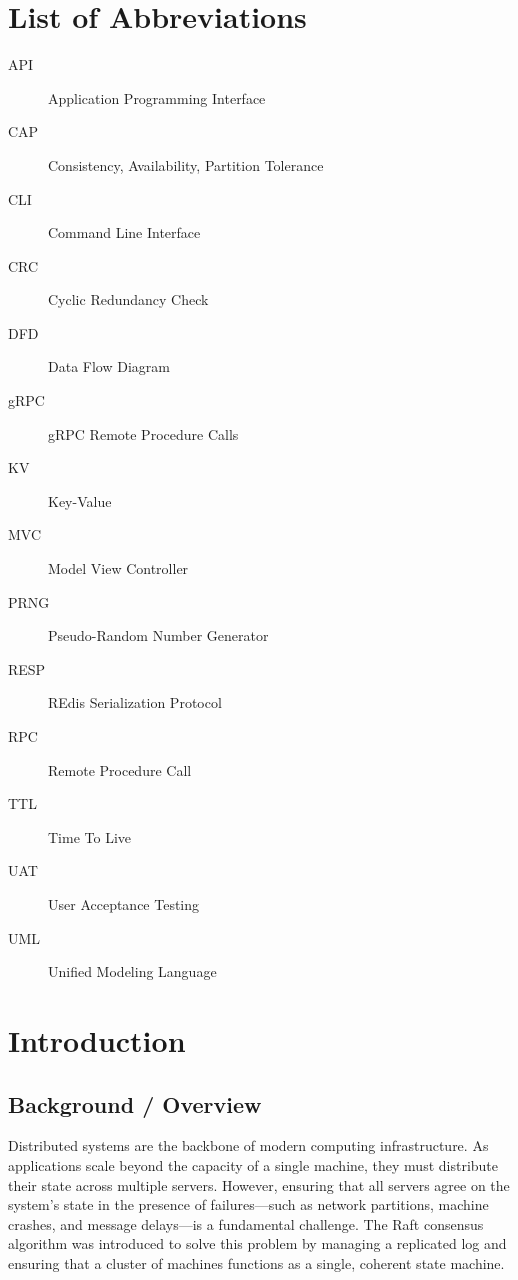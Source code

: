 \documentclass[12pt,a4paper]{report}
\begin{document}
\chapter*{List of Abbreviations}

\begin{description}
    \item[API] Application Programming Interface
    \item[CAP] Consistency, Availability, Partition Tolerance
    \item[CLI] Command Line Interface
    \item[CRC] Cyclic Redundancy Check
    \item[DFD] Data Flow Diagram
    \item[gRPC] gRPC Remote Procedure Calls
    \item[KV] Key-Value
    \item[MVC] Model View Controller
    \item[PRNG] Pseudo-Random Number Generator
    \item[RESP] REdis Serialization Protocol
    \item[RPC] Remote Procedure Call
    \item[TTL] Time To Live
    \item[UAT] User Acceptance Testing
    \item[UML] Unified Modeling Language
\end{description}

\newpage
{}

\chapter{Introduction}

\section{Background / Overview}
Distributed systems are the backbone of modern computing infrastructure. As applications scale beyond the capacity of a single machine, they must distribute their state across multiple servers. However, ensuring that all servers agree on the system's state in the presence of failures—such as network partitions, machine crashes, and message delays—is a fundamental challenge. The Raft consensus algorithm was introduced to solve this problem by managing a replicated log and ensuring that a cluster of machines functions as a single, coherent state machine.
\end{document}
